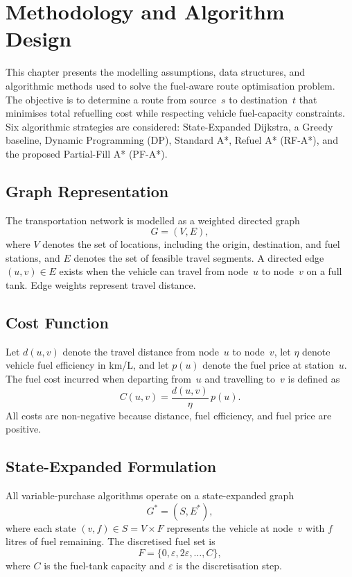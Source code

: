 \chapter{Methodology and Algorithm Design}
\label{ch:algorithms}

This chapter presents the modelling assumptions, data structures, and algorithmic methods used to solve the fuel-aware route optimisation problem. The objective is to determine a route from source~$s$ to destination~$t$ that minimises total refuelling cost while respecting vehicle fuel-capacity constraints. Six algorithmic strategies are considered: State-Expanded Dijkstra, a Greedy baseline, Dynamic Programming (DP), Standard A*, Refuel A* (RF-A*), and the proposed Partial-Fill A* (PF-A*).

\section{Graph Representation}

The transportation network is modelled as a weighted directed graph
\[
G=(V,E),
\]
where $V$ denotes the set of locations, including the origin, destination, and fuel stations, and $E$ denotes the set of feasible travel segments. A directed edge $(u,v) \in E$ exists when the vehicle can travel from node~$u$ to node~$v$ on a full tank. Edge weights represent travel distance.

\section{Cost Function}

Let $d(u,v)$ denote the travel distance from node~$u$ to node~$v$, let $\eta$ denote vehicle fuel efficiency in km/L, and let $p(u)$ denote the fuel price at station~$u$. The fuel cost incurred when departing from~$u$ and travelling to~$v$ is defined as
\[
C(u,v)=\frac{d(u,v)}{\eta}\,p(u).
\]
All costs are non-negative because distance, fuel efficiency, and fuel price are positive.

\section{State-Expanded Formulation}
\label{sec:state_expanded}

All variable-purchase algorithms operate on a state-expanded graph
\[
G^{*}=(S,E^{*}),
\]
where each state $(v,f)\in S=V\times F$ represents the vehicle at node~$v$ with $f$ litres of fuel remaining. The discretised fuel set is
\[
F=\{0,\varepsilon,2\varepsilon,\ldots,C\},
\]
where $C$ is the fuel-tank capacity and $\varepsilon$ is the discretisation step.

